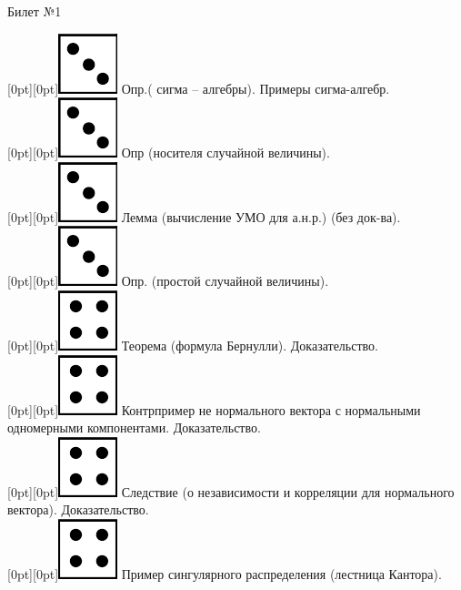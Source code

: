\documentclass[10pt]{article}
\begin{document}
 
\begin{center} {\Large Билет №1} \end{center} 

\raisebox{-1pt}[0pt][0pt]{\includegraphics[width=0.02\linewidth]{3.png}} Опр.( сигма – алгебры). Примеры сигма-алгебр. \\

\raisebox{-1pt}[0pt][0pt]{\includegraphics[width=0.02\linewidth]{3.png}} Опр (носителя случайной величины). \\

\raisebox{-1pt}[0pt][0pt]{\includegraphics[width=0.02\linewidth]{3.png}} Лемма (вычисление УМО для а.н.р.)  (без док-ва). \\

\raisebox{-1pt}[0pt][0pt]{\includegraphics[width=0.02\linewidth]{3.png}} Опр. (простой случайной величины). \\

\raisebox{-1pt}[0pt][0pt]{\includegraphics[width=0.02\linewidth]{4.png}} Теорема (формула Бернулли). Доказательство. \\

\raisebox{-1pt}[0pt][0pt]{\includegraphics[width=0.02\linewidth]{4.png}} Контрпример не нормального вектора с нормальными одномерными компонентами. Доказательство. \\ 

\raisebox{-1pt}[0pt][0pt]{\includegraphics[width=0.02\linewidth]{4.png}} Следствие (о независимости и корреляции для нормального вектора). Доказательство. \\

\raisebox{-1pt}[0pt][0pt]{\includegraphics[width=0.02\linewidth]{4.png}}   Пример сингулярного распределения (лестница Кантора). \\
\end{document}
